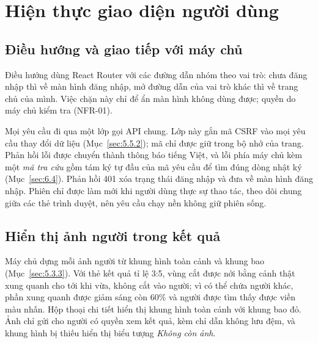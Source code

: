 \section{Hiện thực giao diện người dùng}
\label{sec:6.3}

\subsection{Điều hướng và giao tiếp với máy chủ}
\label{sec:6.3.1}
\label{sec:6.3.2}

Điều hướng dùng React Router với các đường dẫn nhóm theo vai trò: chưa đăng nhập thì về màn hình đăng nhập, mở đường dẫn của vai trò khác thì về trang chủ của mình. Việc chặn này chỉ để ẩn màn hình không dùng được; quyền do máy chủ kiểm tra (NFR-01).

Mọi yêu cầu đi qua một lớp gọi API chung. Lớp này gắn mã CSRF vào mọi yêu cầu thay đổi dữ liệu (Mục~\ref{sec:5.5.2}); mã chỉ được giữ trong bộ nhớ của trang. Phản hồi lỗi được chuyển thành thông báo tiếng Việt, và lỗi phía máy chủ kèm một \emph{mã tra cứu} gồm tám ký tự đầu của mã yêu cầu để tìm đúng dòng nhật ký (Mục~\ref{sec:6.4}). Phản hồi 401 xóa trạng thái đăng nhập và đưa về màn hình đăng nhập. Phiên chỉ được làm mới khi người dùng thực sự thao tác, theo dõi chung giữa các thẻ trình duyệt, nên yêu cầu chạy nền không giữ phiên sống.

\subsection{Hiển thị ảnh người trong kết quả}
\label{sec:6.3.3}

Máy chủ dựng mỗi ảnh người từ khung hình toàn cảnh và khung bao (Mục~\ref{sec:5.3.3}). Với thẻ kết quả tỉ lệ 3:5, vùng cắt được nới bằng cảnh thật xung quanh cho tới khi vừa, không cắt vào người; vì có thể chứa người khác, phần xung quanh được giảm sáng còn 60\% và người được tìm thấy được viền màu nhấn. Hộp thoại chi tiết hiển thị khung hình toàn cảnh với khung bao đỏ. Ảnh chỉ gửi cho người có quyền xem kết quả, kèm chỉ dẫn không lưu đệm, và khung hình bị thiếu hiển thị biểu tượng \emph{Không còn ảnh}.

